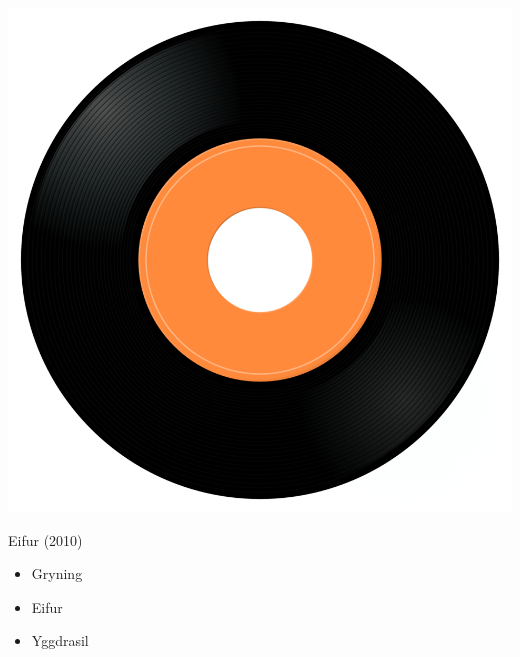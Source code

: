 \begin{minipage}[t]{0.25\textwidth}
\captionsetup{type=figure}
\includegraphics[width=\textwidth]{Images/cover.png}
\caption*{Eifur (2010)}
\end{minipage}
\begin{minipage}[t]{0.25\textwidth}\vspace{0pt}
\begin{itemize}[nosep,leftmargin=1em,labelwidth=*,align=left]
	\setlength{\itemsep}{0pt}
	\item Gryning
	\item Eifur
	\item Yggdrasil
\end{itemize}
\end{minipage}
